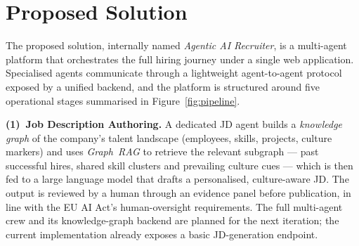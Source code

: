 \begin{table}[H]
    \centering
    \caption{Capability coverage across reviewed platforms.}
    \label{tab:existing-solutions}
\end{table}

\section{Proposed Solution}
The proposed solution, internally named \emph{Agentic AI Recruiter}, is a
multi-agent platform that orchestrates the full hiring journey under a
single web application. Specialised agents communicate through a lightweight
agent-to-agent protocol exposed by a unified backend, and the platform is
structured around five operational stages summarised in
Figure~\ref{fig:pipeline}.

\textbf{(1)~Job Description Authoring.} A dedicated JD agent builds a
\emph{knowledge graph} of the company's talent landscape (employees,
skills, projects, culture markers) and uses \emph{Graph~RAG} to retrieve
the relevant subgraph — past successful hires, shared skill clusters and
prevailing culture cues — which is then fed to a large language model
that drafts a personalised, culture-aware JD. The output is reviewed by a
human through an evidence panel before publication, in line with the EU
AI Act's human-oversight requirements. The full multi-agent crew and its
knowledge-graph backend are planned for the next iteration; the current
implementation already exposes a basic JD-generation endpoint.


